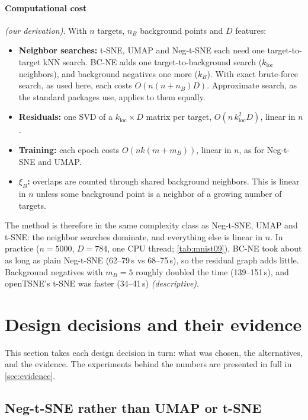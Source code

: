 \documentclass[10pt]{article}
\newcommand{\methodname}{BC-NE}
\newcommand{\cder}{\textit{\small (our derivation)}}
\newcommand{\cdesc}{\textit{\small (descriptive)}}
\newcommand{\xiB}{\xi_{B}}
\newcommand{\kloc}{k_{\mathrm{loc}}}
\begin{document}
\paragraph{Computational cost} \cder. With $n$ targets, $n_B$ background points and $D$ features:
\label{sec:cost}
\begin{itemize}
  \item \textbf{Neighbor searches:} t-SNE, UMAP and Neg-t-SNE each need one target-to-target kNN search. \methodname{} adds one target-to-background search ($\kloc$ neighbors), and background negatives one more ($k_B$). With exact brute-force search, as used here, each costs $O(n(n+n_B)D)$. Approximate search, as the standard packages use, applies to them equally.
  \item \textbf{Residuals:} one SVD of a $\kloc \times D$ matrix per target, $O(n\,\kloc^2 D)$, linear in $n$.
  \item \textbf{Training:} each epoch costs $O(nk(m+m_B))$, linear in $n$, as for Neg-t-SNE and UMAP.
  \item \textbf{$\xiB$:} overlaps are counted through shared background neighbors. This is linear in $n$ unless some background point is a neighbor of a growing number of targets.
\end{itemize}
The method is therefore in the same complexity class as Neg-t-SNE, UMAP and t-SNE: the neighbor searches dominate, and everything else is linear in $n$. In practice ($n = 5000$, $D = 784$, one CPU thread; \cref{tab:mnist09}), \methodname{} took about as long as plain Neg-t-SNE (62--79\,s vs 68--75\,s), so the residual graph adds little. Background negatives with $m_B = 5$ roughly doubled the time (139--151\,s), and openTSNE's t-SNE was faster (34--41\,s) \cdesc.

\section{Design decisions and their evidence}
\label{sec:decisions}

This section takes each design decision in turn: what was chosen, the alternatives, and the evidence. The experiments behind the numbers are presented in full in \cref{sec:evidence}.

\subsection{Neg-t-SNE rather than UMAP or t-SNE}
\label{sec:dec-neg}
\end{document}
